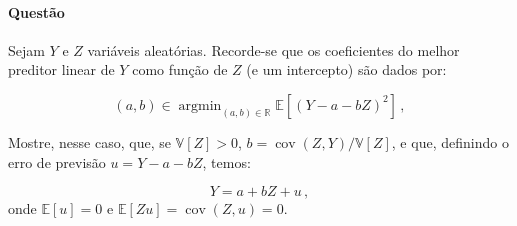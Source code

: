 \documentclass[10pt,a4paper]{article}
\begin{document}
\paragraph{Questão} Sejam $Y$ e $Z$ variáveis aleatórias. Recorde-se que os coeficientes do melhor preditor linear de $Y$ como função de $Z$ (e um intercepto) são  dados por:

$$(a,b) \in \operatorname{argmin}_{(a,b) \in \mathbb{R}}\mathbb{E}[(Y-a-bZ)^2]\,,$$

Mostre, nesse caso, que, se $\mathbb{V}[Z] > 0$, $b =\operatorname{cov}(Z,Y)/\mathbb{V}[Z]$, e que, definindo o erro de previsão $u = Y - a - b Z$, temos:

$$Y = a + bZ + u \, ,$$
onde $\mathbb{E}[u] = 0$ e $\mathbb{E}[Zu] = \operatorname{cov}(Z,u) = 0$.

	
\end{document}
